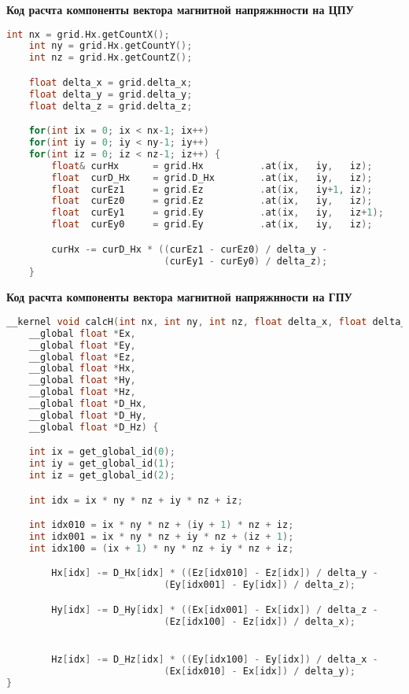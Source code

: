 
\textbf{Код расчта компоненты вектора магнитной напряжнности на ЦПУ}

\begin{lstlisting}[label={lst:HCPU},language=C++]
    int nx = grid.Hx.getCountX();
    int ny = grid.Hx.getCountY();
    int nz = grid.Hx.getCountZ();

    float delta_x = grid.delta_x;
    float delta_y = grid.delta_y;
    float delta_z = grid.delta_z;

    for(int ix = 0; ix < nx-1; ix++)
    for(int iy = 0; iy < ny-1; iy++)
    for(int iz = 0; iz < nz-1; iz++) {
        float& curHx      = grid.Hx          .at(ix,   iy,   iz);
        float  curD_Hx    = grid.D_Hx        .at(ix,   iy,   iz);
        float  curEz1     = grid.Ez          .at(ix,   iy+1, iz);
        float  curEz0     = grid.Ez          .at(ix,   iy,   iz);
        float  curEy1     = grid.Ey          .at(ix,   iy,   iz+1);
        float  curEy0     = grid.Ey          .at(ix,   iy,   iz);

        curHx -= curD_Hx * ((curEz1 - curEz0) / delta_y -
                            (curEy1 - curEy0) / delta_z);
    }
\end{lstlisting}

\clearpage


\textbf{Код расчта компоненты вектора магнитной напряжнности на ГПУ}

\begin{lstlisting}[label={lst:HGPU},language=C++]
__kernel void calcH(int nx, int ny, int nz, float delta_x, float delta_y, float delta_z,
    __global float *Ex,
    __global float *Ey,
    __global float *Ez,
    __global float *Hx,
    __global float *Hy,
    __global float *Hz,
    __global float *D_Hx,
    __global float *D_Hy,
    __global float *D_Hz) {

    int ix = get_global_id(0);
    int iy = get_global_id(1);
    int iz = get_global_id(2);

    int idx = ix * ny * nz + iy * nz + iz;

    int idx010 = ix * ny * nz + (iy + 1) * nz + iz;
    int idx001 = ix * ny * nz + iy * nz + (iz + 1);
    int idx100 = (ix + 1) * ny * nz + iy * nz + iz;

        Hx[idx] -= D_Hx[idx] * ((Ez[idx010] - Ez[idx]) / delta_y -
                            (Ey[idx001] - Ey[idx]) / delta_z);

        Hy[idx] -= D_Hy[idx] * ((Ex[idx001] - Ex[idx]) / delta_z -
                            (Ez[idx100] - Ez[idx]) / delta_x);


        Hz[idx] -= D_Hz[idx] * ((Ey[idx100] - Ey[idx]) / delta_x -
                            (Ex[idx010] - Ex[idx]) / delta_y);
}
\end{lstlisting}